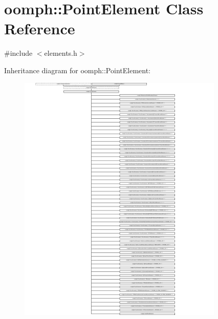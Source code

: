 \hypertarget{classoomph_1_1PointElement}{}\section{oomph\+:\+:Point\+Element Class Reference}
\label{classoomph_1_1PointElement}


{\ttfamily \#include $<$elements.\+h$>$}

Inheritance diagram for oomph\+:\+:Point\+Element\+:\begin{figure}[H]
\begin{center}
\leavevmode
\includegraphics[height=12.000000cm]{classoomph_1_1PointElement}
\end{center}
\end{figure}
